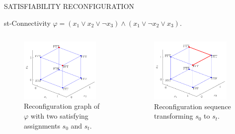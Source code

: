\begin{frame}{SATISFIABILITY RECONFIGURATION}
    \begin{block}{st-Connectivity $\varphi = (x_1 \vee x_2 \vee \neg x_3) \wedge (x_1 \vee \neg x_2 \vee x_3)$.}
        \begin{columns}
            \begin{column}{0.5\textwidth}
                \begin{figure}
                \centering
                \includegraphics[width=0.9\textwidth]{img/sat_1.png}
                \caption{Reconfiguration graph of $\varphi$ with two satisfying assignments $s_0$ and $s_t$. }
                \label{fig:ps}
                \end{figure}
            \end{column}
            \pause
            \begin{column}{0.5\textwidth}
                \begin{figure}
                \centering
                \includegraphics[width=0.9\textwidth]{img/sat_2.png}
                \caption{Reconfiguration sequence transforming $s_0$ to $s_t$. \hfill \break}
                \label{fig:circle}
                \end{figure}
            \end{column}
        \end{columns}
    \end{block}
\end{frame}

